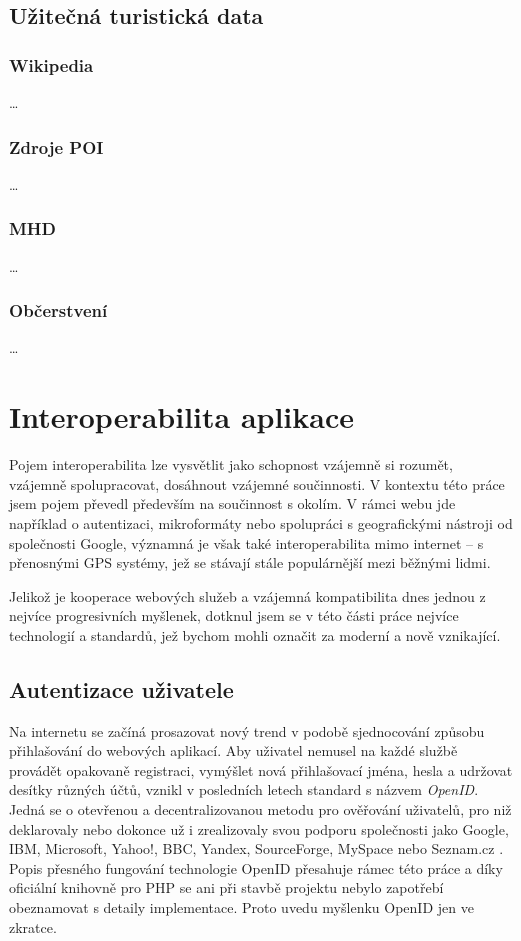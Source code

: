 \section{Užitečná turistická data}
\subsection{Wikipedia}
\ldots
\subsection{Zdroje POI}
\ldots
\subsection{MHD}
\ldots
\subsection{Občerstvení}
\ldots

\chapter{Interoperabilita aplikace}
Pojem interoperabilita lze vysvětlit jako schopnost vzájemně si
rozumět, vzájemně spolupracovat, dosáhnout vzájemné součinnosti. V
kontextu této práce jsem pojem převedl především na součinnost s
okolím. V rámci webu jde například o autentizaci, mikroformáty nebo
spolupráci s geografickými nástroji od společnosti Google, významná je
však také interoperabilita mimo internet -- s přenosnými GPS systémy,
jež se stávají stále populárnější mezi běžnými lidmi.

Jelikož je kooperace webových služeb a vzájemná kompatibilita dnes
jednou z nejvíce progresivních myšlenek, dotknul jsem se v této části
práce nejvíce technologií a standardů, jež bychom mohli označit za
moderní a nově vznikající.

\section{Autentizace uživatele}\label{openid}
Na internetu se začíná prosazovat nový trend v podobě sjednocování
způsobu přihlašování do webových aplikací. Aby uživatel nemusel na každé
službě provádět opakovaně registraci, vymýšlet nová
přihlašovací jména, hesla a udržovat desítky různých účtů, vznikl v
posledních letech standard s názvem {\it OpenID}. Jedná se o
otevřenou a decentralizovanou metodu pro ověřování uživatelů, pro niž
deklarovaly nebo dokonce už i zrealizovaly svou podporu společnosti
jako Google, IBM, Microsoft, Yahoo!, BBC, Yandex, SourceForge, MySpace
nebo Seznam.cz \cite{dataportability}. Popis přesného fungování technologie
OpenID přesahuje rámec této práce a díky oficiální knihovně pro PHP
se ani při stavbě projektu nebylo zapotřebí obeznamovat s detaily
implementace. Proto uvedu myšlenku OpenID jen ve zkratce.

